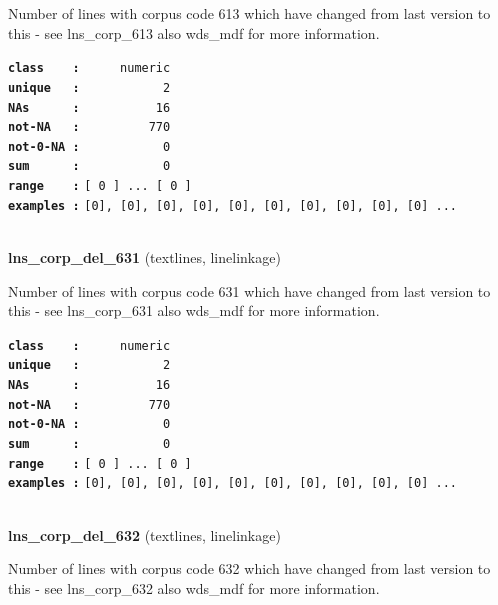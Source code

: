 \documentclass[]{article}
\begin{document}
Number of lines with corpus code 613 which have changed from last
version to this - see lns\_corp\_613 also wds\_mdf for more information.

\textbf{\texttt{class\ \ \ \ :}} \texttt{~~~~~numeric}\\
\textbf{\texttt{unique\ \ \ :}} \texttt{~~~~~~~~~~~2}\\
\textbf{\texttt{NAs\ \ \ \ \ \ :}} \texttt{~~~~~~~~~~16}\\
\textbf{\texttt{not-NA\ \ \ :}} \texttt{~~~~~~~~~770}\\
\textbf{\texttt{not-0-NA\ :}} \texttt{~~~~~~~~~~~0}\\
\textbf{\texttt{sum\ \ \ \ \ \ :}} \texttt{~~~~~~~~~~~0}\\
\textbf{\texttt{range\ \ \ \ :}}
\texttt{{[}\ 0\ {]}\ ...\ {[}\ 0\ {]}}\\
\textbf{\texttt{examples\ :}}
\texttt{{[}0{]},\ {[}0{]},\ {[}0{]},\ {[}0{]},\ {[}0{]},\ {[}0{]},\ {[}0{]},\ {[}0{]},\ {[}0{]},\ {[}0{]}\ ...}\\

~

\textbf{lns\_corp\_del\_631} (textlines, linelinkage)

Number of lines with corpus code 631 which have changed from last
version to this - see lns\_corp\_631 also wds\_mdf for more information.

\textbf{\texttt{class\ \ \ \ :}} \texttt{~~~~~numeric}\\
\textbf{\texttt{unique\ \ \ :}} \texttt{~~~~~~~~~~~2}\\
\textbf{\texttt{NAs\ \ \ \ \ \ :}} \texttt{~~~~~~~~~~16}\\
\textbf{\texttt{not-NA\ \ \ :}} \texttt{~~~~~~~~~770}\\
\textbf{\texttt{not-0-NA\ :}} \texttt{~~~~~~~~~~~0}\\
\textbf{\texttt{sum\ \ \ \ \ \ :}} \texttt{~~~~~~~~~~~0}\\
\textbf{\texttt{range\ \ \ \ :}}
\texttt{{[}\ 0\ {]}\ ...\ {[}\ 0\ {]}}\\
\textbf{\texttt{examples\ :}}
\texttt{{[}0{]},\ {[}0{]},\ {[}0{]},\ {[}0{]},\ {[}0{]},\ {[}0{]},\ {[}0{]},\ {[}0{]},\ {[}0{]},\ {[}0{]}\ ...}\\

~

\textbf{lns\_corp\_del\_632} (textlines, linelinkage)

Number of lines with corpus code 632 which have changed from last
version to this - see lns\_corp\_632 also wds\_mdf for more information.
\end{document}
